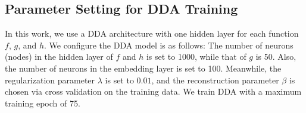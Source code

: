 
\subsection{Parameter Setting for DDA Training}
\label{sec:setting}

In this work, we use a DDA architecture with one hidden layer for each function $f$, $g$, and $h$. We configure the DDA model is as follows: The number of neurons (nodes) in the hidden layer of $f$ and $h$ is set to 1000, while that of $g$ is 50. Also, the number of neurons in the embedding layer is set to 100. Meanwhile, the regularization parameter $\lambda$ is set to $0.01$, and the reconstruction parameter $\beta$ is chosen via cross validation on the training data. We train DDA with a maximum training epoch of 75.



